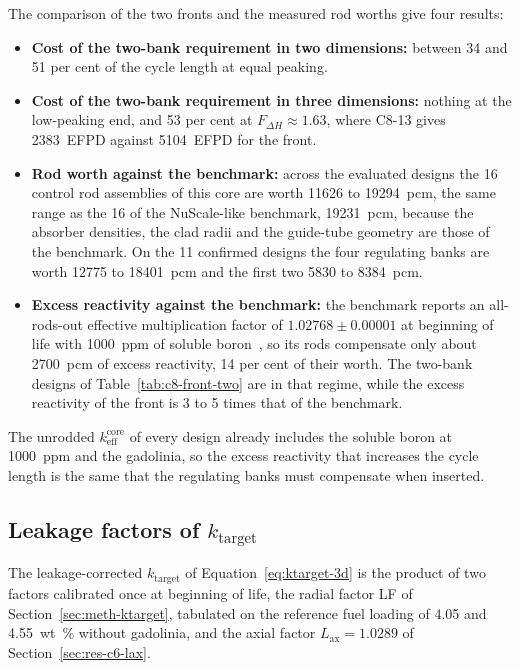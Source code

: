 The comparison of the two fronts and the measured rod worths give four
results:

\begin{itemize}
  \item \textbf{Cost of the two-bank requirement in two dimensions:}
        between 34 and 51 per cent of the cycle length at equal
        peaking.
  \item \textbf{Cost of the two-bank requirement in three dimensions:}
        nothing at the low-peaking end, and 53 per cent at $F_{\Delta H} \approx 1.63$,
        where C8-13 gives \SI{2383}{EFPD} against \SI{5104}{EFPD} for
        the front.
  \item \textbf{Rod worth against the benchmark:} across the evaluated
        designs the 16 control rod assemblies of this core are worth
        \num{11626} to \SI{19294}{pcm}, the same range as the 16 of the
        NuScale-like benchmark, \SI{19231}{pcm}, because the absorber
        densities, the clad radii and the guide-tube geometry are those
        of the benchmark. On the 11 confirmed designs the four regulating
        banks are worth \num{12775} to \SI{18401}{pcm} and the first two
        \num{5830} to \SI{8384}{pcm}.
  \item \textbf{Excess reactivity against the benchmark:} the benchmark
        reports an all-rods-out effective multiplication factor of
        $1.02768 \pm 0.00001$ at beginning of life with \SI{1000}{ppm}
        of soluble boron~\cite{fridman_nuscale_benchmark_2023}, so its
        rods compensate only about \SI{2700}{pcm} of excess reactivity,
        14 per cent of their worth. The two-bank designs of
        Table~\ref{tab:c8-front-two} are in that regime, while the
        excess reactivity of the front is 3 to 5 times that of the
        benchmark.
\end{itemize}

The unrodded $k_\mathrm{eff}^\mathrm{core}$ of every design already
includes the soluble boron at \SI{1000}{ppm} and the gadolinia, so the
excess reactivity that increases the cycle length is the same that the
regulating banks must compensate when inserted.

\subsection{Leakage factors of \texorpdfstring{$k_\mathrm{target}$}{k-target}}
\label{sec:res-kt-burnup}

The leakage-corrected $k_\mathrm{target}$ of Equation~\eqref{eq:ktarget-3d}
is the product of two factors calibrated once at beginning of life, the
radial factor LF of Section~\ref{sec:meth-ktarget}, tabulated on the
reference fuel loading of 4.05 and \SI{4.55}{wt\%} without gadolinia,
and the axial factor $L_\mathrm{ax} = 1.0289$ of
Section~\ref{sec:res-c6-lax}.

